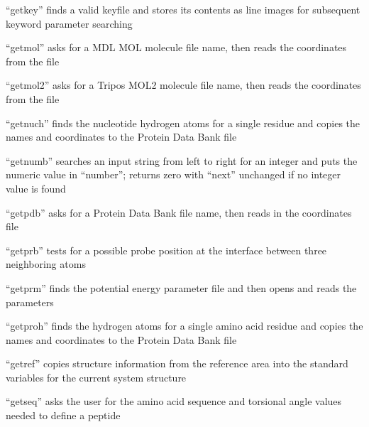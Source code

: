 \documentclass[letterpaper,11pt,english]{sphinxmanual}
\begin{document}
“getkey” finds a valid keyfile and stores its contents as
line images for subsequent keyword parameter searching


“getmol” asks for a MDL MOL molecule file name,
then reads the coordinates from the file


“getmol2” asks for a Tripos MOL2 molecule file name,
then reads the coordinates from the file



“getnuch” finds the nucleotide hydrogen atoms for a single
residue and copies the names and coordinates to the Protein
Data Bank file


“getnumb” searches an input string from left to right for an
integer and puts the numeric value in “number”; returns zero
with “next” unchanged if no integer value is found


“getpdb” asks for a Protein Data Bank file name,
then reads in the coordinates file


“getprb” tests for a possible probe position at the interface
between three neighboring atoms


“getprm” finds the potential energy parameter file
and then opens and reads the parameters


“getproh” finds the hydrogen atoms for a single amino acid
residue and copies the names and coordinates to the Protein
Data Bank file


“getref” copies structure information from the reference area
into the standard variables for the current system structure


“getseq” asks the user for the amino acid sequence
and torsional angle values needed to define a peptide

\end{document}

